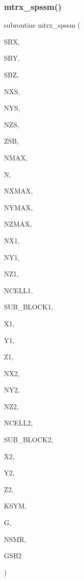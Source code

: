 \subsubsection{\texorpdfstring{mtrx\+\_\+spssm()}{mtrx\_spssm()}}
{\footnotesize\ttfamily subroutine mtrx\+\_\+spssm (\begin{DoxyParamCaption}\item[{real}]{S\+BX,  }\item[{real}]{S\+BY,  }\item[{real}]{S\+BZ,  }\item[{integer}]{N\+XS,  }\item[{integer}]{N\+YS,  }\item[{integer}]{N\+ZS,  }\item[{real}]{Z\+SB,  }\item[{integer}]{N\+M\+AX,  }\item[{integer}]{N,  }\item[{integer}]{N\+X\+M\+AX,  }\item[{integer}]{N\+Y\+M\+AX,  }\item[{integer}]{N\+Z\+M\+AX,  }\item[{integer, dimension(sub\+\_\+block1)}]{N\+X1,  }\item[{integer, dimension(sub\+\_\+block1)}]{N\+Y1,  }\item[{integer, dimension(sub\+\_\+block1)}]{N\+Z1,  }\item[{integer, dimension(sub\+\_\+block1)}]{N\+C\+E\+L\+L1,  }\item[{integer}]{S\+U\+B\+\_\+\+B\+L\+O\+C\+K1,  }\item[{real, dimension(nxmax,sub\+\_\+block1)}]{X1,  }\item[{real, dimension(nymax,sub\+\_\+block1)}]{Y1,  }\item[{real, dimension(nzmax,sub\+\_\+block1)}]{Z1,  }\item[{integer, dimension(sub\+\_\+block2)}]{N\+X2,  }\item[{integer, dimension(sub\+\_\+block2)}]{N\+Y2,  }\item[{integer, dimension(sub\+\_\+block2)}]{N\+Z2,  }\item[{integer, dimension(sub\+\_\+block2)}]{N\+C\+E\+L\+L2,  }\item[{integer}]{S\+U\+B\+\_\+\+B\+L\+O\+C\+K2,  }\item[{real, dimension(nxmax,sub\+\_\+block2)}]{X2,  }\item[{real, dimension(nymax,sub\+\_\+block2)}]{Y2,  }\item[{real, dimension(nzmax,sub\+\_\+block2)}]{Z2,  }\item[{integer}]{K\+S\+YM,  }\item[{complex, dimension(nmax,n)}]{G,  }\item[{integer}]{N\+S\+MR,  }\item[{complex, dimension(nsmr/3,3)}]{G\+S\+B2 }\end{DoxyParamCaption})}

